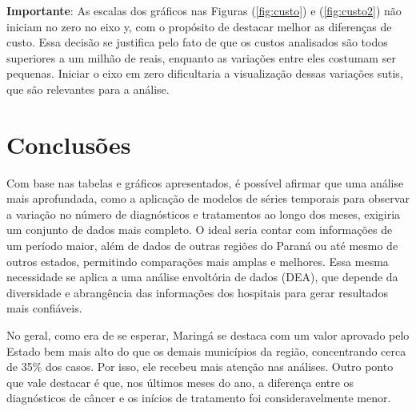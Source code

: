 \documentclass[a4paper]{modeloLEA} %
\begin{document}
\newpage

\textbf{Importante}: As escalas dos gráficos nas Figuras (\ref{fig:custo}) e (\ref{fig:custo2}) não iniciam no zero no eixo y, com o propósito de destacar melhor as diferenças de custo. Essa decisão se justifica pelo fato de que os custos analisados são todos superiores a um milhão de reais, enquanto as variações entre eles costumam ser pequenas. Iniciar o eixo em zero dificultaria a visualização dessas variações sutis, que são relevantes para a análise.

\section{Conclusões}\label{conclusuxf5es}

Com base nas tabelas e gráficos apresentados, é possível afirmar que uma análise mais aprofundada, como a aplicação de modelos de séries temporais para observar a variação no número de diagnósticos e tratamentos ao longo dos meses, exigiria um conjunto de dados mais completo. O ideal seria contar com informações de um período maior, além de dados de outras regiões do Paraná ou até mesmo de outros estados, permitindo comparações mais amplas e melhores. Essa mesma necessidade se aplica a uma análise envoltória de dados (DEA), que depende da diversidade e abrangência das informações dos hospitais para gerar resultados mais confiáveis.

No geral, como era de se esperar, Maringá se destaca com um valor aprovado pelo Estado bem mais alto do que os demais municípios da região, concentrando cerca de 35\% dos casos. Por isso, ele recebeu mais atenção nas análises. Outro ponto que vale destacar é que, nos últimos meses do ano, a diferença entre os diagnósticos de câncer e os inícios de tratamento foi consideravelmente menor.









\end{document}
